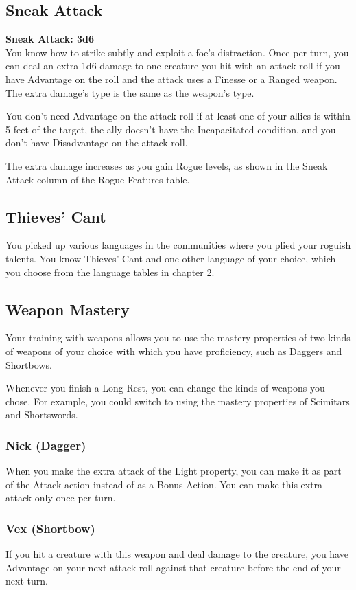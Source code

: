 \documentclass[letterpaper,openany,oneside,twocolumn]{book}
\begin{document}
\subsection*{Sneak Attack}
\textbf{Sneak Attack: 3d6}\\
You know how to strike subtly and exploit a foe's distraction. Once per turn, you can deal an extra 1d6 damage to one creature you hit with an attack roll if you have Advantage on the roll and the attack uses a Finesse or a Ranged weapon. The extra damage's type is the same as the weapon's type.

You don't need Advantage on the attack roll if at least one of your allies is within 5 feet of the target, the ally doesn't have the Incapacitated condition, and you don't have Disadvantage on the attack roll.

The extra damage increases as you gain Rogue levels, as shown in the Sneak Attack column of the Rogue Features table.
\subsection*{Thieves' Cant}
You picked up various languages in the communities where you plied your roguish talents. You know Thieves' Cant and one other language of your choice, which you choose from the language tables in chapter 2.
\subsection*{Weapon Mastery}
Your training with weapons allows you to use the mastery properties of two kinds of weapons of your choice with which you have proficiency, such as Daggers and Shortbows.

Whenever you finish a Long Rest, you can change the kinds of weapons you chose. For example, you could switch to using the mastery properties of Scimitars and Shortswords.
\subsubsection*{Nick (Dagger)}
When you make the extra attack of the Light property, you can make it as part of the Attack action instead of as a Bonus Action. You can make this extra attack only once per turn.
\subsubsection*{Vex (Shortbow)}
If you hit a creature with this weapon and deal damage to the creature, you have Advantage on your next attack roll against that creature before the end of your next turn.
\end{document}
